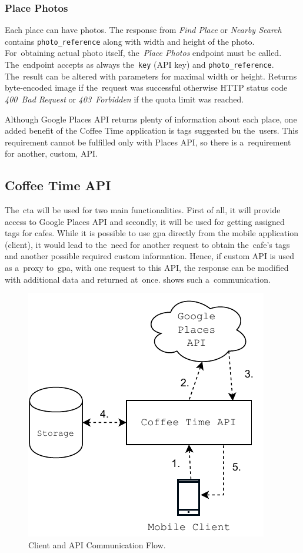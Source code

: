 \subsubsection{Place Photos}
Each place can have photos. The response from \textit{Find Place} or \textit{Nearby Search} contains \verb|photo_reference| along with width and height of the photo. For~obtaining actual photo itself, the~\textit{Place Photos} endpoint must be called. The~endpoint accepts as always the~\verb|key| (API key) and \verb|photo_reference|. The~result can be altered with parameters for maximal width or height. Returns byte-encoded image if the~request was successful otherwise HTTP status code \textit{400~Bad Request} or \textit{403~Forbidden} if the quota limit was reached. 

Although Google Places API returns plenty of information about each place, one added benefit of the Coffee Time application is tags suggested bu the~users. This requirement cannot be fulfilled only with Places API, so there is a~requirement for another, custom, API. 
\subsection{Coffee Time API}
The~\gls{cta} will be used for two main functionalities. First of all, it will provide access to Google Places API and secondly, it will be used for getting assigned tags for cafes. While it is possible to use \gls{gpa} directly from the mobile application (client), it would lead to the~need for another request to obtain the~cafe's tags and another possible required custom information. Hence, if custom API is used as a~proxy to~\gls{gpa}, with one request to this API, the response can be modified with additional data and returned at~once.  shows such a~communication. 

\begin{figure}[ht]
    \centering
    \includegraphics[width=0.5\linewidth]{img/analysis/api-communication-flow.pdf}
    \caption{Client and API Communication Flow.}
    \label{fig:api-communication}
\end{figure}

